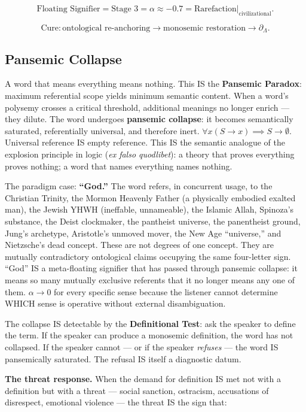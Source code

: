 \documentclass[11pt, oneside]{article}
\theoremstyle{definition}
\begin{document}
$$\boxed{\text{Floating Signifier} = \text{Stage 3} = \alpha \approx -0.7 = \text{Rarefaction}|_{\text{civilizational}}.}$$

$$\boxed{\text{Cure}: \text{ontological re-anchoring} \to \text{monosemic restoration} \to \partial_\Lambda.}$$

\subsection{Pansemic Collapse}

A word that means everything means nothing. This IS the \textbf{Pansemic Paradox}: maximum referential scope yields minimum semantic content. When a word's polysemy crosses a critical threshold, additional meanings no longer enrich --- they dilute. The word undergoes \textbf{pansemic collapse}: it becomes semantically saturated, referentially universal, and therefore inert. $\forall x (S \to x) \implies S \to \emptyset$. Universal reference IS empty reference. This IS the semantic analogue of the explosion principle in logic (\textit{ex falso quodlibet}): a theory that proves everything proves nothing; a word that names everything names nothing.

The paradigm case: \textbf{``God.''} The word refers, in concurrent usage, to the Christian Trinity, the Mormon Heavenly Father (a physically embodied exalted man), the Jewish YHWH (ineffable, unnameable), the Islamic Allah, Spinoza's substance, the Deist clockmaker, the pantheist universe, the panentheist ground, Jung's archetype, Aristotle's unmoved mover, the New Age ``universe,'' and Nietzsche's dead concept. These are not degrees of one concept. They are mutually contradictory ontological claims occupying the same four-letter sign. ``God'' IS a meta-floating signifier that has passed through pansemic collapse: it means so many mutually exclusive referents that it no longer means any one of them. $\alpha \to 0$ for every specific sense because the listener cannot determine WHICH sense is operative without external disambiguation.

The collapse IS detectable by the \textbf{Definitional Test}: ask the speaker to define the term. If the speaker can produce a monosemic definition, the word has not collapsed. If the speaker cannot --- or if the speaker \textit{refuses} --- the word IS pansemically saturated. The refusal IS itself a diagnostic datum.

\textbf{The threat response.} When the demand for definition IS met not with a definition but with a threat --- social sanction, ostracism, accusations of disrespect, emotional violence --- the threat IS the sign that:
\end{document}
